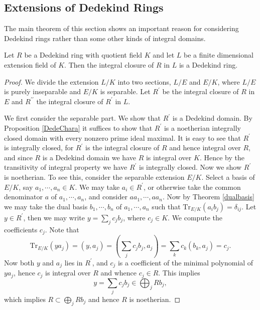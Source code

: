 \subsection{Extensions of Dedekind Rings}
The main theorem of this section shows an important reason for considering Dedekind rings rather than some other kinds of integral domains.
\begin{theorem}\label{Ext}
Let $R$ be a Dedekind ring with quotient field $K$ and let $L$ be a finite dimensional extension field of $K$. Then the integral closure of $R$ in $L$ is a Dedekind ring.
\end{theorem}
\begin{proof}
We divide the extension $L/K$ into two sections, $L/E$ and $E/K$, where $L/E$ is purely inseparable and $E/K$ is separable. Let $R^\prime$ be the integral closure of $R$ in $E$ and $R^{\prime\prime}$ the integral closure of $R^\prime$ in $L$.\par
We first consider the separable part. We show that $R^\prime$ is a Dedekind domain. By Proposition \ref{DedeChara} it suffices to show that $R^\prime$ is a noetherian integrally closed domain with every nonzero prime ideal maximal. It is easy to see that $R^\prime$ is integrally closed, for $R^\prime$ is the integral closure of $R$ and hence integral over $R$, and since $R$ is a Dedekind domain we have $R$ is integral over $K$. Hence by the transitivity of integral property we have $R^\prime$ is integrally closed. Now we show $R^\prime$ is noetherian. To see this, consider the separable extension $E/K$. Select a basis of $E/K$, say $a_1,\cdots,a_n\in K$. We may take $a_i\in R^\prime$, or otherwise take the common denominator $a$ of $a_1,\cdots,a_n$, and consider $aa_1,\cdots,aa_n$. Now by Theorem \ref{dualbasis} we may take the dual basis $b_1,\cdots,b_n$ of $a_1,\cdots,a_n$ such that $\mathrm{Tr}_{E/K}\left( a_ib_j \right) =\delta _{ij}$. Let $y\in R^\prime$, then we may write $y=\sum_jc_jb_j$, where $c_j\in K$. We compute the coefficients $c_j$. Note that 
$$
\mathrm{Tr}_{E/K}\left( ya_j \right) =\left( y,a_j \right) =\left( \sum_j{c_jb_j},a_j \right) =\sum_k{c_k\left( b_k,a_j \right)}=c_j.
$$
Now both $y$ and $a_j$ lies in $R^\prime$, and $c_j$ is a coefficient of the minimal polynomial of $ya_j$, hence $c_j$ is integral over $R$ and whence $c_j\in R$. This implies 
$$
y=\sum_j{c_jb_j}\in \bigoplus_j{Rb_j},
$$
which implies $R\subset\bigoplus_jRb_j$ and hence $R$ is noetherian.\par

\end{proof}
